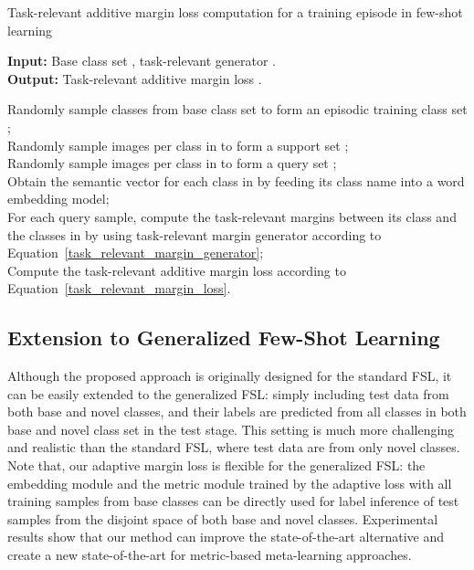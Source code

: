 \documentclass[10pt,twocolumn,letterpaper]{article}
\begin{document}
\begin{algorithm}[t]
\caption{Task-relevant additive margin loss computation for a training episode in few-shot learning}
\label{alg:traml}
\textbf{Input:} Base class set , task-relevant  generator .\\ 
\textbf{Output:} Task-relevant additive margin loss .

\begin{algorithmic}[1]
\STATE  Randomly sample  classes from base class set  to form an episodic training class set ;\\
\STATE  Randomly sample  images per class in  to form a support set ; \\
\STATE  Randomly sample  images per class in  to form a query set ; \\
\STATE  Obtain the semantic vector for each class in  by feeding its class name into a word embedding model; \\
\STATE  For each query sample, compute the task-relevant margins between its class  and the classes in  by using task-relevant margin generator  according to Equation~\ref{task_relevant_margin_generator};\\
\STATE  Compute the task-relevant additive margin loss  according to Equation~\ref{task_relevant_margin_loss}.
\end{algorithmic}
\end{algorithm}

\subsection{Extension to Generalized Few-Shot Learning}

Although the proposed approach is originally designed for the standard FSL, it can be easily extended to the generalized FSL: simply including test data from both base and novel classes, and their labels are predicted from all classes in
both base and novel class set in the test stage. This setting is much more challenging
and realistic than the standard FSL, where test data are from only novel classes. Note that, our adaptive margin loss is flexible for the generalized FSL: the embedding module and the metric module trained by the adaptive loss with all training samples from base classes can be directly used for label inference of test samples from the disjoint space of both base and novel classes. Experimental results show that our method can improve the state-of-the-art alternative and create a new state-of-the-art for metric-based meta-learning approaches.
\end{document}
